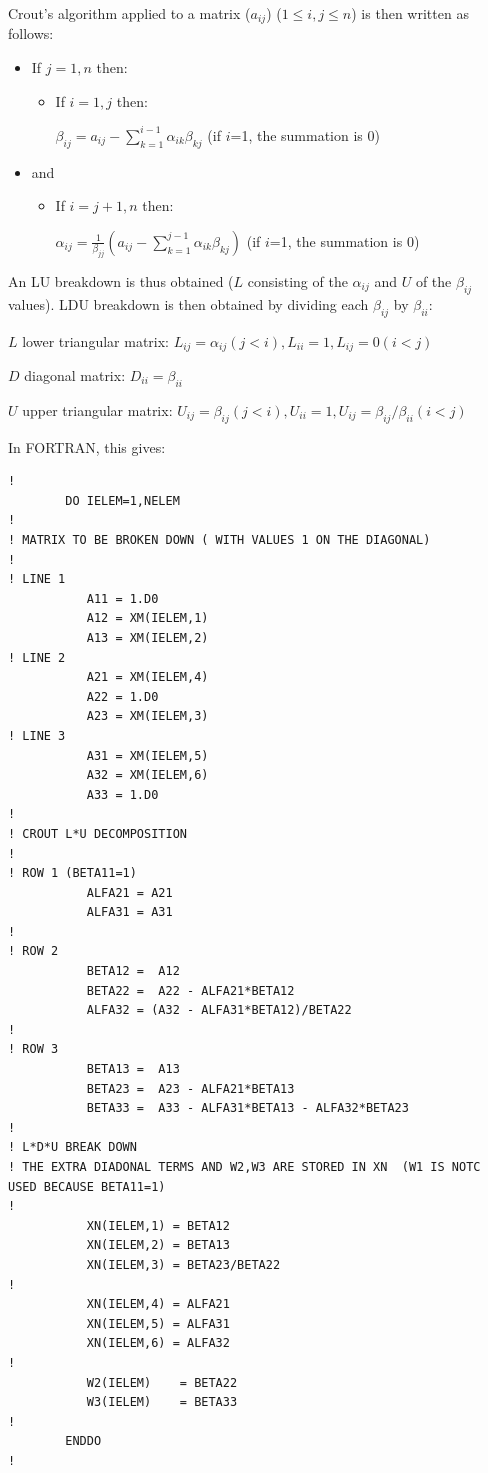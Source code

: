Crout's algorithm applied to a matrix ($a_{ij}$)
($1 \mathrm{\le} i, j \mathrm{\le} n$)
is then written as follows:
\begin{itemize}
  \item If $j=1,n$ then:

    \begin{itemize}
      \item If $i=1,j$ then:

$\beta _{ij} =a_{ij} -\sum _{k=1}^{i-1}\alpha _{ik} \beta _{kj}  $ (if $i$=1, the
summation is 0)
\end{itemize}

\item and

  \begin{itemize}
    \item If $i=j+1,n$ then:

$\alpha _{ij} =\frac{1}{\beta _{jj} } (a_{ij} -\sum _{k=1}^{j-1}\alpha _{ik}
\beta _{kj} ) $  (if $i$=1, the summation is 0)
\end{itemize}
\end{itemize}

An LU breakdown is thus obtained ($L$ consisting of the $\alpha _{ij}$ and $U$ of
the $\beta _{ij}$ values). LDU breakdown is then obtained by dividing each
$\beta _{ij}$ by $\beta _{ii}$:

$L$ lower triangular matrix: $L_{ij} = \alpha _{ij} (j<i), L_{ii} = 1, L_{ij} = 0 (i<j)$

$D$ diagonal matrix: $D_{ii} = \beta _{ii}$

$U$ upper triangular matrix: $U_{ij} = \beta _{ij} (j<i), U_{ii} = 1, U_{ij} = \beta _{ij} / \beta _{ii} (i<j)$


In FORTRAN, this gives:
\begin{lstlisting}[language=TelFortran]
!
        DO IELEM=1,NELEM
!
! MATRIX TO BE BROKEN DOWN ( WITH VALUES 1 ON THE DIAGONAL)
!
! LINE 1
           A11 = 1.D0
           A12 = XM(IELEM,1)
           A13 = XM(IELEM,2)
! LINE 2
           A21 = XM(IELEM,4)
           A22 = 1.D0
           A23 = XM(IELEM,3)
! LINE 3
           A31 = XM(IELEM,5)
           A32 = XM(IELEM,6)
           A33 = 1.D0
!
! CROUT L*U DECOMPOSITION
!
! ROW 1 (BETA11=1)
           ALFA21 = A21
           ALFA31 = A31
!
! ROW 2
           BETA12 =  A12
           BETA22 =  A22 - ALFA21*BETA12
           ALFA32 = (A32 - ALFA31*BETA12)/BETA22
!
! ROW 3
           BETA13 =  A13
           BETA23 =  A23 - ALFA21*BETA13
           BETA33 =  A33 - ALFA31*BETA13 - ALFA32*BETA23
!
! L*D*U BREAK DOWN
! THE EXTRA DIADONAL TERMS AND W2,W3 ARE STORED IN XN  (W1 IS NOTC USED BECAUSE BETA11=1)
!
           XN(IELEM,1) = BETA12
           XN(IELEM,2) = BETA13
           XN(IELEM,3) = BETA23/BETA22
!
           XN(IELEM,4) = ALFA21
           XN(IELEM,5) = ALFA31
           XN(IELEM,6) = ALFA32
!
           W2(IELEM)    = BETA22
           W3(IELEM)    = BETA33
!
        ENDDO
!
\end{lstlisting}

